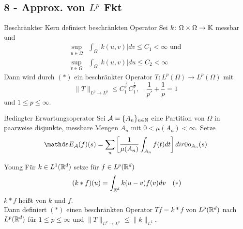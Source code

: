 \subsection*{8 - Approx. von $L^{p}$ Fkt}

	\begin{karte}{Beschränkter Kern definiert beschränkten Operator}
		Sei $k \colon \Omega \times \Omega \rightarrow \mathbb{K}$ messbar	und
		\begin{align*}
			\sup_{u \in \Omega} & \int_{\Omega} |k(u, v)| dv \leq C_{1} < \infty \text{ und} \\
			\sup_{v \in \Omega} & \int_{\Omega} |k(u, v)| du \leq C_{2} < \infty
		\end{align*}
		Dann wird durch \hyperref[eq:8.0-BeschrOperatorInLp]{$(*)$} ein beschränkter Operator $T \colon L^{p}(\Omega) \rightarrow L^{p}(\Omega)$ mit
		\[ \| T \|_{L^{p} \rightarrow L^{p}} \leq C_{1}^{\frac{1}{p'}} C_{1}^{\frac{1}{p}}, \quad \frac{1}{p'} + \frac{1}{p} = 1   \]
		und $1 \leq p \leq \infty$.		
	\end{karte}
	
	\begin{karte}{Bedingter Erwartungsoperator} 
	Sei $\mathcal{A} = \{ A_{n} \}_{n \in \mathbb{N}}$ eine Partition von $\Omega$ in paarweise disjunkte, messbare Mengen $A_{n}$ mit $0 < \mu(A_{n}) < \infty$. Setze
	\[ \EW_{\ca}(f)(s) = \sum_{n} \left[ \frac{1}{\mu(A_{n})} \int_{A_{n}} f(t) dt \right] \1_{A_{n}}(s) \] 
	\end{karte}
	
	\begin{karte}{Young}
		Für $k \in L^{1}(\mathbb{R}^{d})$ setze für $f \in L^{p}(\mathbb{R}^{d})$
		\[ (k \ast f) (u) = \int_{\MdR^{d}} k(u - v) f(v) dv \quad (*) \label{eq:8.5-Young} \]
		$k \ast f$ hei{\ss}t  von $k$ und $f$. \\
		Dann definiert \hyperref[eq:8.5-Young]{$(*)$} einen beschränkten Operator $T f = k \ast f$ von $L^{p}(\mathbb{R}^{d})$ nach $L^{p}(\mathbb{R}^{d})$ für $1 \leq p \leq \infty$ und $\|T\|_{L^{p} \rightarrow L^{p}} \leq \|k\|_{L^{1}}$.
	\end{karte}